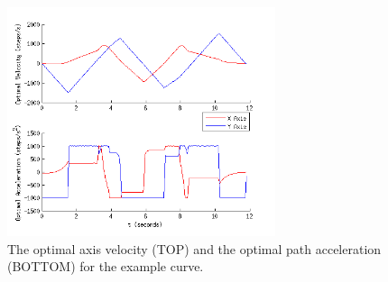 \begin{figure}[htbp]
\centering
\includegraphics[width=0.7\textwidth]{figures/optimisation/bangbang_xy_ddt_dt.png}
\caption[$\dot{\textbf{q}}^*(t)$ and $\ddot{\textbf{q}}^*(t)$]{
The optimal axis velocity (TOP) and the optimal path acceleration (BOTTOM) for the example curve.
\label{fig:bangbang}}
\end{figure}
